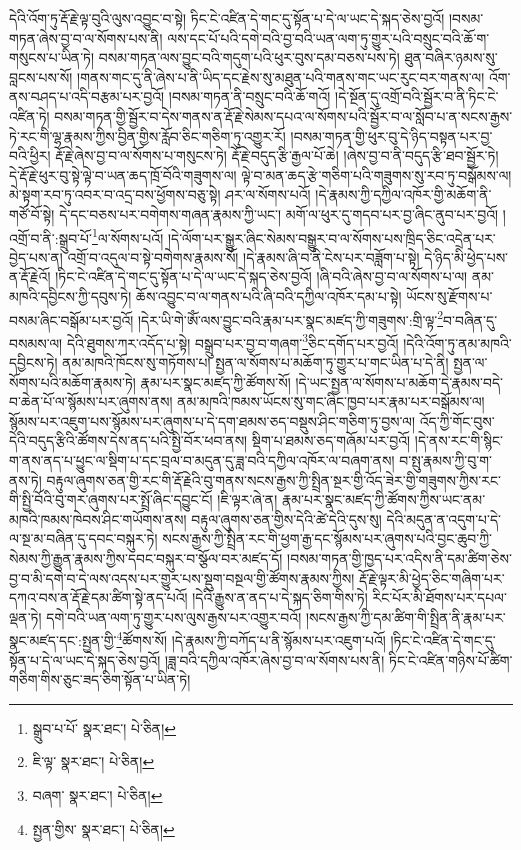 དེའི་འོག་ཏུ་རྡོ་རྗེ་ལྟ་བུའི་ལུས་འབྱུང་བ་སྟེ། ཏིང་ངེ་འཛིན་དེ་གང་དུ་སྟོན་པ་དེ་ལ་ཡང་དེ་སྐད་ཅེས་བྱའོ། །བསམ་གཏན་ཞེས་བྱ་བ་ལ་སོགས་པས་ནི། ལས་དང་པོ་པའི་དགེ་བའི་བྱ་བའི་ཡན་ལག་ཏུ་གྱུར་པའི་བསྲུང་བའི་ཆོ་ག་གསུངས་པ་ཡིན་ཏེ། བསམ་གཏན་ལས་བྱུང་བའི་གདུག་པའི་ཕུར་བུས་དམ་བཅས་པས་ཏེ། ཐུན་བཞིར་ཉམས་སུ་བླངས་པས་སོ། །གནས་གང་དུ་ནི་ཞེས་པ་ནི་ཡིད་དང་རྗེས་སུ་མཐུན་པའི་གནས་གང་ཡང་རུང་བར་གནས་ལ། འོག་ནས་བཤད་པ་འདི་བརྩམ་པར་བྱའོ། །བསམ་གཏན་ནི་བསྲུང་བའི་ཆོ་གའོ། །དེ་སྔོན་དུ་འགྲོ་བའི་སྦྱོར་བ་ནི་ཏིང་ངེ་འཛིན་ཏེ། བསམ་གཏན་གྱི་སྦྱོར་བ་དེས་གནས་ན་རྡོ་རྗེ་སེམས་དཔའ་ལ་སོགས་པའི་སྦྱོར་བ་ལ་སློབ་པ་ན་སངས་རྒྱས་ཏེ་རང་གི་ལྷ་རྣམས་ཀྱིས་བྱིན་གྱིས་རློབ་ཅིང་གཅིག་ཏུ་འགྱུར་རོ། །བསམ་གཏན་གྱི་ཕུར་བུ་དེ་ཉིད་བསྟན་པར་བྱ་བའི་ཕྱིར། རྡོ་རྗེ་ཞེས་བྱ་བ་ལ་སོགས་པ་གསུངས་ཏེ། རྡོ་རྗེ་བདུད་རྩི་རྒྱལ་པོ་ཆེ། །ཞེས་བྱ་བ་ནི་བདུད་རྩི་ཐབ་སྦྱོར་ཏེ། དེ་རྡོ་རྗེ་ཕུར་བུ་སྟེ་ལྟེ་བ་ཡན་ཆད་ཁྲོ་བོའི་གཟུགས་ལ། ལྟེ་བ་མན་ཆད་རྩེ་གཅིག་པའི་གཟུགས་སུ་རབ་ཏུ་བསྒོམས་ལ། མེ་སྟག་རབ་ཏུ་འབར་བ་འདྲ་བས་ཕྱོགས་བཅུ་སྟེ། ཤར་ལ་སོགས་པའོ། །དེ་རྣམས་ཀྱི་དཀྱིལ་འཁོར་གྱི་མཆོག་ནི་གཙོ་བོ་སྟེ། དེ་དང་བཅས་པར་བགེགས་གཞན་རྣམས་ཀྱི་ཡང་། མགོ་ལ་ཕུར་དུ་གདབ་པར་བྱ་ཞིང་ནུབ་པར་བྱའོ། །འགྲོ་བ་ནི་:སྒྲུབ་པོ་\footnote{སྒྲུབ་པ་པོ་  སྣར་ཐང་།  པེ་ཅིན། }ལ་སོགས་པའོ། །དེ་ལོག་པར་སྒྱུར་ཞིང་སེམས་བསྒྱུར་བ་ལ་སོགས་པས་ཁྲིད་ཅིང་འདྲེན་པར་བྱེད་པས་ན། འགྲོ་བ་འདུལ་བ་སྟེ་བགེགས་རྣམས་སོ། །དེ་རྣམས་ཞི་བ་ནི་ངེས་པར་བཟློག་པ་སྟེ། དེ་ཉིད་མི་ཕྱེད་པས་ན་རྡོ་རྗེའོ། །ཏིང་ངེ་འཛིན་དེ་གང་དུ་སྟོན་པ་དེ་ལ་ཡང་དེ་སྐད་ཅེས་བྱའོ། །ཞི་བའི་ཞེས་བྱ་བ་ལ་སོགས་པ་ལ། ནམ་མཁའི་དབྱིངས་ཀྱི་དབུས་ཏེ། ཆོས་འབྱུང་བ་ལ་གནས་པའི་ཞི་བའི་དཀྱིལ་འཁོར་དམ་པ་སྟེ། ཡོངས་སུ་རྫོགས་པ་བསམ་ཞིང་བསྒོམ་པར་བྱའོ། །དེར་ཡི་གེ་ཨོཾ་ལས་བྱུང་བའི་རྣམ་པར་སྣང་མཛད་ཀྱི་གཟུགས་:གྲི་ལྟ་\footnote{ཇི་ལྟ་  སྣར་ཐང་།  པེ་ཅིན། }བ་བཞིན་དུ་བསམས་ལ། དེའི་ཐུགས་ཀར་འདོད་པ་སྟེ། བསྒྲུབ་པར་བྱ་བ་གཞག་\footnote{བཞག་  སྣར་ཐང་།  པེ་ཅིན། }ཅིང་དགོད་པར་བྱའོ། །དེའི་འོག་ཏུ་ནམ་མཁའི་དབྱིངས་ཏེ། ནམ་མཁའི་ཁོངས་སུ་གཏོགས་པ། སྤྱན་ལ་སོགས་པ་མཆོག་ཏུ་གྱུར་པ་གང་ཡིན་པ་དེ་ནི། སྤྱན་ལ་སོགས་པའི་མཆོག་རྣམས་ཏེ། རྣམ་པར་སྣང་མཛད་ཀྱི་ཚོགས་སོ། །དེ་ཡང་སྤྱན་ལ་སོགས་པ་མཆོག་དེ་རྣམས་བདེ་བ་ཆེན་པོ་ལ་སྙོམས་པར་ཞུགས་ནས། ནམ་མཁའི་ཁམས་ཡོངས་སུ་གང་ཞིང་ཁྱབ་པར་རྣམ་པར་བསྒོམས་ལ། སྙོམས་པར་འཇུག་པས་སྙོམས་པར་ཞུགས་པ་དེ་དག་ཐམས་ཅད་བསྡུས་ཤིང་གཅིག་ཏུ་བྱས་ལ། འོད་ཀྱི་གོང་བུས་དེའི་བདུད་རྩིའི་ཚོགས་དེས་ནད་པའི་སྤྱི་བོར་ཕབ་ནས། སྡིག་པ་ཐམས་ཅད་གཞོམ་པར་བྱའོ། །དེ་ནས་རང་གི་སྙིང་ག་ནས་ནད་པ་ཕྱུང་ལ་སྡིག་པ་དང་བྲལ་བ་མདུན་དུ་ཟླ་བའི་དཀྱིལ་འཁོར་ལ་བཞག་ནས། བ་སྤུ་རྣམས་ཀྱི་བུ་ག་ནས་ཏེ། བརྟུལ་ཞུགས་ཅན་གྱི་རང་གི་རྡོ་རྗེའི་བུ་གནས་སངས་རྒྱས་ཀྱི་སྤྲིན་སྔར་གྱི་འོད་ཟེར་གྱི་གཟུགས་ཀྱིས་རང་གི་སྤྱི་བོའི་བུ་གར་ཞུགས་པར་སྤྲོ་ཞིང་དབྱུང་ངོ། །ཇི་ལྟར་ཞེ་ན། རྣམ་པར་སྣང་མཛད་ཀྱི་ཚོགས་ཀྱིས་ཡང་ནམ་མཁའི་ཁམས་ཁེབས་ཤིང་གཡོགས་ནས། བརྟུལ་ཞུགས་ཅན་གྱིས་དེའི་ཚེ་དེའི་དུས་སུ། དེའི་མདུན་ན་འདུག་པ་དེ་ལ་སྔ་མ་བཞིན་དུ་དབང་བསྐུར་ཏེ། སངས་རྒྱས་ཀྱི་སྤྲིན་རང་གི་ཕྱག་རྒྱ་དང་སྙོམས་པར་ཞུགས་པའི་བྱང་ཆུབ་ཀྱི་སེམས་ཀྱི་རྒྱུན་རྣམས་ཀྱིས་དབང་བསྐུར་བ་སྩོལ་བར་མཛད་དོ། །བསམ་གཏན་གྱི་ཁྱད་པར་འདིས་ནི་དམ་ཚིག་ཅེས་བྱ་བ་མི་དགེ་བ་དེ་ལས་འདས་པར་གྱུར་པས་སྡུག་བསྔལ་གྱི་ཚོགས་རྣམས་ཀྱིས། རྡོ་རྗེ་ལྟར་མི་ཕྱེད་ཅིང་གཞིག་པར་དཀའ་བས་ན་རྡོ་རྗེ་དམ་ཚིག་སྟེ་ནད་པའོ། །དེའི་རྒྱུས་ན་ནད་པ་དེ་སྐད་ཅིག་གིས་ཏེ། རིང་པོར་མི་ཐོགས་པར་དཔལ་ལྡན་ཏེ། དགེ་བའི་ཡན་ལག་ཏུ་གྱུར་པས་ལུས་རྒྱས་པར་འགྱུར་བའོ། །སངས་རྒྱས་ཀྱི་དམ་ཚིག་གི་སྤྲིན་ནི་རྣམ་པར་སྣང་མཛད་དང་:སྤྱན་གྱི་\footnote{སྤྱན་གྱིས་  སྣར་ཐང་།  པེ་ཅིན། }ཚོགས་སོ། །དེ་རྣམས་ཀྱི་བཀོད་པ་ནི་སྙོམས་པར་འཇུག་པའོ། །ཏིང་ངེ་འཛིན་དེ་གང་དུ་སྟོན་པ་དེ་ལ་ཡང་དེ་སྐད་ཅེས་བྱའོ། །ཟླ་བའི་དཀྱིལ་འཁོར་ཞེས་བྱ་བ་ལ་སོགས་པས་ནི། ཏིང་ངེ་འཛིན་གཉིས་པོ་ཚིག་གཅིག་གིས་ཅུང་ཟད་ཅིག་སྟོན་པ་ཡིན་ཏེ། 